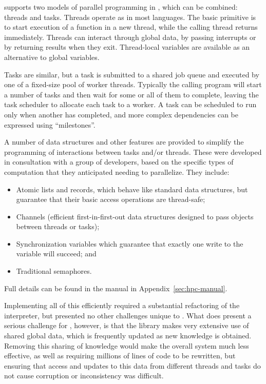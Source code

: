 \HPCGAP supports two models of parallel programming in \GAP, which can
be combined: threads and tasks. Threads operate as in most languages.
The basic primitive is to start execution of a \GAP function in a new
thread, while the calling thread returns immediately. Threads can
interact through global data, by passing interrupts or by returning
results when they exit. Thread-local variables are available as an
alternative to global variables.

Tasks are
similar, but a task is submitted to a shared job queue and executed by
one of a fixed-size pool of worker threads. Typically the calling
program will start a number of tasks and then wait for some or all
of them to complete, leaving the task scheduler to allocate each task
to a worker. A task can be scheduled to run only when another
has completed, and more complex dependencies can be expressed using
``milestones''.

A number of data structures and other features are provided to
simplify the programming of interactions between tasks and/or
threads. These were developed in consultation with a group of \GAP
developers, based on the specific types of computation that they
anticipated needing to parallelize. They include:
\begin{itemize}
\item Atomic lists and records, which behave like standard \GAP data
    structures, but guarantee that their basic access operations are
    thread-safe;
  \item Channels (efficient first-in-first-out data structures
    designed to pass objects between threads or tasks);
  \item Synchronization variables which guarantee that exactly one
    write to the variable will succeed; and
  \item Traditional semaphores.
\end{itemize}
Full details can be found in the \HPCGAP manual in Appendix~\ref{sec:hpc-manual}.

Implementing all of this efficiently required a substantial
refactoring of the \GAP interpreter, but presented no other challenges
unique to \GAP.  What does present a serious challenge for \HPCGAP, however, is that the \GAP
library makes very extensive use of shared global data, which is
frequently updated as new knowledge is obtained. Removing this sharing
of knowledge would make the overall system much less effective, as
well as requiring millions of lines of code to be rewritten, but
ensuring that access and updates to this data from different threads
and tasks do not cause corruption or inconsistency was difficult.


